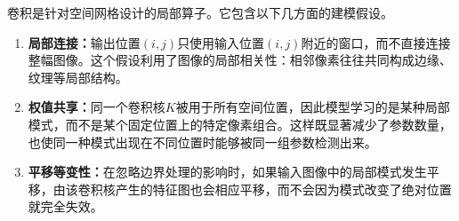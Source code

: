 \begin{note}
	卷积是针对空间网格设计的局部算子。它包含以下几方面的建模假设。
	\begin{enumerate}
		\item \textbf{局部连接：}输出位置$(i,j)$只使用输入位置$(i,j)$附近的窗口，而不直接连接整幅图像。这个假设利用了图像的局部相关性：相邻像素往往共同构成边缘、纹理等局部结构。
		\item \textbf{权值共享：}同一个卷积核$K$被用于所有空间位置，因此模型学习的是某种局部模式，而不是某个固定位置上的特定像素组合。这样既显著减少了参数数量，也使同一种模式出现在不同位置时能够被同一组参数检测出来。
		\item \textbf{平移等变性：}在忽略边界处理的影响时，如果输入图像中的局部模式发生平移，由该卷积核产生的特征图也会相应平移，而不会因为模式改变了绝对位置就完全失效。
	\end{enumerate}
\end{note}
